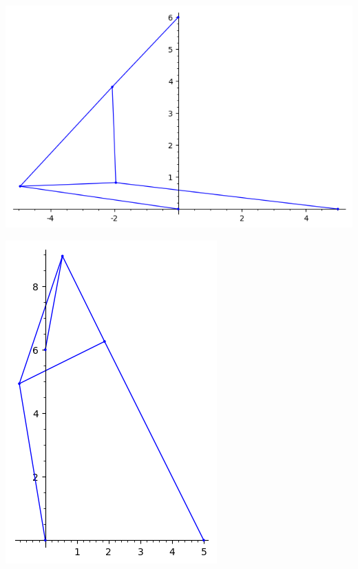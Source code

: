 \documentclass{article}
\begin{document}
\begin{multicols}{2}
\begin{center}
\includegraphics[scale=0.3]{lidur5b3plot}
\end{center}
\columnbreak
\begin{center}
\includegraphics[scale=0.4]{lidur5b4plot}
\end{center}
\end{multicols}
\end{document}
